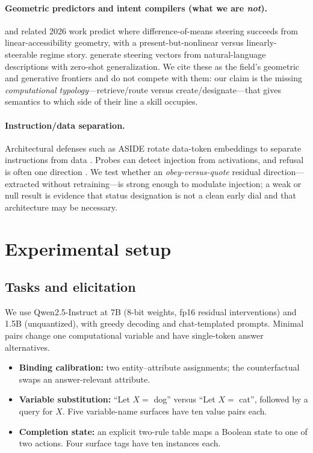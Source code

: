 \documentclass[10pt]{article}
\begin{document}
\paragraph{Geometric predictors and intent compilers (what we are \emph{not}).}
\citet{lap2026predicting} and related 2026 work
\citep{geometriccanary2026,whensteerable2026} predict where difference-of-means
steering succeeds from linear-accessibility geometry, with a present-but-nonlinear
versus linearly-steerable regime story. \citet{sun2025hypersteer} generate
steering vectors from natural-language descriptions with zero-shot
generalization. We cite these as the field's geometric and generative frontiers
and do not compete with them: our claim is the missing
\emph{computational typology}---retrieve/route versus create/designate---that
gives semantics to which side of their line a skill occupies.

\paragraph{Instruction/data separation.}
Architectural defenses such as ASIDE rotate data-token embeddings to separate
instructions from data \citep{zverev2025aside}. Probes can detect injection from
activations, and refusal is often one direction \citep{arditi2024refusal}. We
test whether an \emph{obey-versus-quote} residual direction---extracted without
retraining---is strong enough to modulate injection; a weak or null result is
evidence that status designation is not a clean early dial and that architecture
may be necessary.

\section{Experimental setup}

\subsection{Tasks and elicitation}

We use Qwen2.5-Instruct \citep{yang2024qwen25} at 7B (8-bit weights, fp16
residual interventions) and 1.5B (unquantized), with greedy decoding and
chat-templated prompts. Minimal pairs change one computational variable and
have single-token answer alternatives.

\begin{itemize}
    \item \textbf{Binding calibration:} two entity--attribute assignments; the
    counterfactual swaps an answer-relevant attribute.
    \item \textbf{Variable substitution:} ``Let $X=$ dog'' versus ``Let
    $X=$ cat'', followed by a query for $X$. Five variable-name surfaces have
    ten value pairs each.
    \item \textbf{Completion state:} an explicit two-rule table maps a Boolean
    state to one of two actions. Four surface tags have ten instances each.
\end{itemize}
\end{document}
